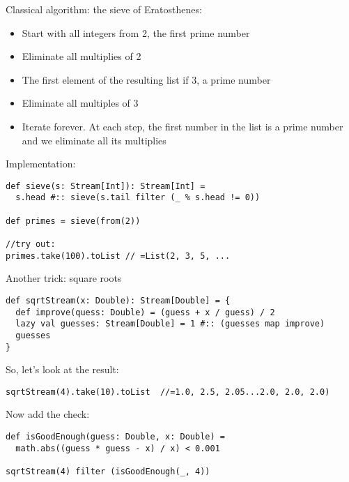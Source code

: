 \documentclass{scrartcl}
\begin{document}
Classical algorithm: the sieve of Eratosthenes:
\begin{itemize}
\item Start with all integers from 2, the first prime number
\item Eliminate all multiplies of 2
\item The first element of the resulting list if 3, a prime number
\item Eliminate all multiples of 3
\item Iterate forever. At each step, the first number in the list is a prime
  number and we eliminate all its multiplies
\end{itemize}
Implementation:
\begin{lstlisting}
def sieve(s: Stream[Int]): Stream[Int] =
  s.head #:: sieve(s.tail filter (_ % s.head != 0))

def primes = sieve(from(2))

//try out:
primes.take(100).toList // =List(2, 3, 5, ...
\end{lstlisting}

Another trick: square roots
\begin{lstlisting}
def sqrtStream(x: Double): Stream[Double] = {
  def improve(quess: Double) = (guess + x / guess) / 2
  lazy val guesses: Stream[Double] = 1 #:: (guesses map improve)
  guesses
}
\end{lstlisting}
So, let's look at the result:
\begin{lstlisting}
sqrtStream(4).take(10).toList  //=1.0, 2.5, 2.05...2.0, 2.0, 2.0)
\end{lstlisting}
Now add the check:
\begin{lstlisting}
def isGoodEnough(guess: Double, x: Double) =
  math.abs((guess * guess - x) / x) < 0.001

sqrtStream(4) filter (isGoodEnough(_, 4))
\end{lstlisting}

\end{document}
